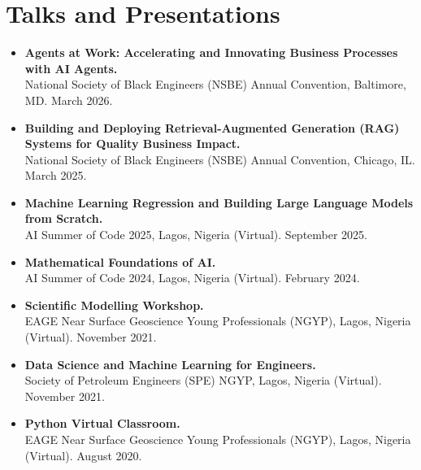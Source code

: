 \documentclass[11pt, letterpaper]{article}
\begin{document}
\section{Talks and Presentations}

\begin{itemize}

  \item \textbf{Agents at Work: Accelerating and Innovating Business Processes with AI Agents.}\\
  National Society of Black Engineers (NSBE) Annual Convention, Baltimore, MD. March 2026.

  \item \textbf{Building and Deploying Retrieval-Augmented Generation (RAG) Systems for Quality Business Impact.}\\
  National Society of Black Engineers (NSBE) Annual Convention, Chicago, IL. March 2025.

  \item \textbf{Machine Learning Regression and Building Large Language Models from Scratch.}\\
  AI Summer of Code 2025, Lagos, Nigeria (Virtual). September 2025.

  \item \textbf{Mathematical Foundations of AI.}\\
  AI Summer of Code 2024, Lagos, Nigeria (Virtual). February 2024.

  \item \textbf{Scientific Modelling Workshop.}\\
  EAGE Near Surface Geoscience Young Professionals (NGYP), Lagos, Nigeria (Virtual). November 2021.

  \item \textbf{Data Science and Machine Learning for Engineers.}\\
  Society of Petroleum Engineers (SPE) NGYP, Lagos, Nigeria (Virtual). November 2021.

  \item \textbf{Python Virtual Classroom.}\\
  EAGE Near Surface Geoscience Young Professionals (NGYP), Lagos, Nigeria (Virtual). August 2020.

\end{itemize}

\end{document}
